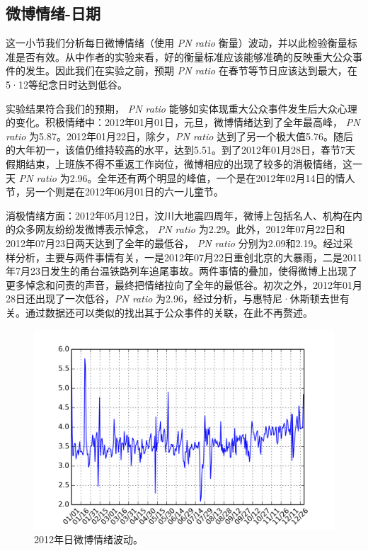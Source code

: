\documentclass[12pt, oneside]{article}
\begin{document}
\begin{spacing}{1.5}
\begin{CJK}{UTF8}{gbsn}
\subsection{微博情绪-日期}
\label{subsec:emotion_date}
这一小节我们分析每日微博情绪（使用 {\it PN ratio} 衡量）波动，并以此检验衡量标准是否有效。从\cite{bollen2011twitter}中作者的实验来看，好的衡量标准应该能够准确的反映重大公众事件的发生。因此我们在实验之前，预期 {\it PN ratio} 在春节等节日应该达到最大，在5·12等纪念日时达到低谷。

实验结果符合我们的预期， {\it PN ratio} 能够如实体现重大公众事件发生后大众心理的变化。积极情绪中：2012年01月01日，元旦，微博情绪达到了全年最高峰， {\it PN ratio} 为5.87。2012年01月22日，除夕，{\it PN ratio} 达到了另一个极大值5.76。随后的大年初一，该值仍维持较高的水平，达到5.51。到了2012年01月28日，春节7天假期结束，上班族不得不重返工作岗位，微博相应的出现了较多的消极情绪，这一天 {\it PN ratio} 为2.96。全年还有两个明显的峰值，一个是在2012年02月14日的情人节，另一个则是在2012年06月01日的六一儿童节。

消极情绪方面：2012年05月12日，汶川大地震四周年，微博上包括名人、机构在内的众多网友纷纷发微博表示悼念， {\it PN ratio} 为2.29。此外，2012年07月22日和2012年07月23日两天达到了全年的最低谷， {\it PN ratio} 分别为2.09和2.19。经过采样分析，主要与两件事情有关，一是2012年07月22日重创北京的大暴雨，二是2011年7月23日发生的甬台温铁路列车追尾事故。两件事情的叠加，使得微博上出现了更多悼念和问责的声音，最终把情绪拉向了全年的最低谷。初次之外，2012年01月28日还出现了一次低谷，{\it PN ratio} 为2.96，经过分析，与惠特尼·休斯顿去世有关。通过数据还可以类似的找出其于公众事件的关联，在此不再赘述。

\begin{figure}
	\centering
	\includegraphics[width=0.8\linewidth]{../result/charts/emotion_day}
	\caption{2012年日微博情绪波动。}
	\label{fig:emotion_day}
\end{figure}


\end{CJK}
\end{spacing}
\end{document}
